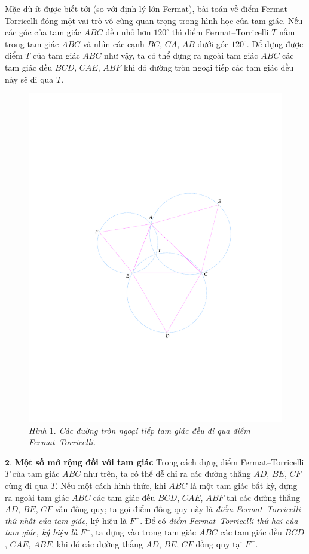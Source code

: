 \begin{multicols}{2}
	\vskip 0.1cm
	Mặc dù ít được biết tới (so với định lý lớn Fermat), bài toán về điểm Fermat--Torricelli đóng một vai trò vô cùng quan trọng trong hình học của tam giác.
	\vskip 0.1cm
	Nếu các góc của tam giác $ABC$ đều nhỏ hơn $120^\circ$ thì điểm Fermat--Torricelli $T$ nằm trong tam giác $ABC$ và nhìn các cạnh $BC$, $CA$, $AB$ dưới góc $120^\circ$. Để dựng được điểm $T$ của tam giác $ABC$ như vậy, ta có thể dựng ra ngoài tam giác $ABC$ các tam giác đều $BCD$, $CAE$, $ABF$ khi đó đường tròn ngoại tiếp các tam giác đều này sẽ đi qua $T$.
	\begin{figure}[H]
		\vspace*{-5pt}
		\centering
		\captionsetup{labelformat= empty, justification=centering}
		\includegraphics[width= 0.9\linewidth]{figure8053}
		\caption{\small\textit{\color{cackithi}Hình $1.$ Các đường tròn ngoại tiếp tam giác đều đi qua điểm Fermat--Torricelli.}}
		\vspace*{-5pt}
	\end{figure}
	$\pmb{2.}$ \textbf{\color{cackithi}Một số mở rộng đối với tam giác}
	\vskip 0.1cm
	Trong cách dựng điểm Fermat--Torricelli $T$ của tam giác $ABC$ như trên, ta có thể dễ chỉ ra các đường thẳng $AD$, $BE$, $CF$ cùng đi qua $T$. Nếu một cách hình thức, khi $ABC$ là một tam giác bất kỳ, dựng ra ngoài tam giác $ABC$ các tam giác đều $BCD$, $CAE$, $ABF$ thì các đường thẳng $AD$, $BE$, $CF$ vẫn đồng quy; ta gọi điểm đồng quy này là \emph{điểm Fermat--Torricelli thứ nhất của tam giác}, ký hiệu là $F^+$. Để có \emph{điểm Fermat--Torricelli thứ hai của tam giác, ký hiệu là $F^-$}, ta dựng vào trong tam giác $ABC$ các tam giác đều $BCD$, $CAE$, $ABF$, khi đó các đường thẳng $AD$, $BE$, $CF$ đồng quy tại $F^-$.

\end{multicols}
